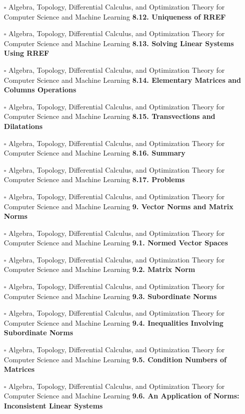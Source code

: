 \documentclass[a4, landscape, 12pt]{article}
\newcommand{\checkbox}{$\square$}%
\begin{document}
\begin{itemize}
{}
\item [\checkbox]  Algebra, Topology, Differential Calculus, and Optimization Theory for Computer Science and Machine Learning \textbf{ 8.12. Uniqueness of RREF
}
\item [\checkbox]  Algebra, Topology, Differential Calculus, and Optimization Theory for Computer Science and Machine Learning \textbf{ 8.13. Solving Linear Systems Using RREF
}
\item [\checkbox]  Algebra, Topology, Differential Calculus, and Optimization Theory for Computer Science and Machine Learning \textbf{ 8.14. Elementary Matrices and Columns Operations
}
\item [\checkbox]  Algebra, Topology, Differential Calculus, and Optimization Theory for Computer Science and Machine Learning \textbf{ 8.15. Transvections and Dilatations
}
\item [\checkbox]  Algebra, Topology, Differential Calculus, and Optimization Theory for Computer Science and Machine Learning \textbf{ 8.16. Summary
}
\item [\checkbox]  Algebra, Topology, Differential Calculus, and Optimization Theory for Computer Science and Machine Learning \textbf{ 8.17. Problems
}
\item [\checkbox]  Algebra, Topology, Differential Calculus, and Optimization Theory for Computer Science and Machine Learning \textbf{ 9. Vector Norms and Matrix Norms
}
\item [\checkbox]  Algebra, Topology, Differential Calculus, and Optimization Theory for Computer Science and Machine Learning \textbf{ 9.1. Normed Vector Spaces
}
\item [\checkbox]  Algebra, Topology, Differential Calculus, and Optimization Theory for Computer Science and Machine Learning \textbf{ 9.2. Matrix Norm
}
\item [\checkbox]  Algebra, Topology, Differential Calculus, and Optimization Theory for Computer Science and Machine Learning \textbf{ 9.3. Subordinate Norms
}
\item [\checkbox]  Algebra, Topology, Differential Calculus, and Optimization Theory for Computer Science and Machine Learning \textbf{ 9.4. Inequalities Involving Subordinate Norms
}
\item [\checkbox]  Algebra, Topology, Differential Calculus, and Optimization Theory for Computer Science and Machine Learning \textbf{ 9.5. Condition Numbers of Matrices
}
\item [\checkbox]  Algebra, Topology, Differential Calculus, and Optimization Theory for Computer Science and Machine Learning \textbf{ 9.6. An Application of Norms: Inconsistent Linear Systems
}
\end{itemize}
\end{document}
